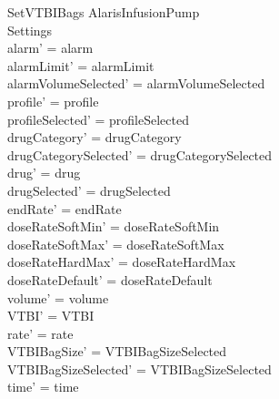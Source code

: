 \begin{schema}{SetVTBIBags}
	\Delta AlarisInfusionPump\\
	 Settings\\
	\where
	alarm' = alarm\\
	alarmLimit' = alarmLimit\\
	alarmVolumeSelected' = alarmVolumeSelected\\
	profile' = profile\\
	profileSelected' = profileSelected\\
	drugCategory' = drugCategory\\ 
	drugCategorySelected' = drugCategorySelected\\
	drug' = drug\\ 
	drugSelected' = drugSelected\\
	endRate' = endRate\\
	doseRateSoftMin' = doseRateSoftMin\\
	doseRateSoftMax' = doseRateSoftMax\\
	doseRateHardMax' = doseRateHardMax\\
	doseRateDefault' = doseRateDefault\\
	volume' = volume\\
	VTBI' = VTBI\\
	rate' = rate\\
	VTBIBagSize' = VTBIBagSizeSelected\\ 
	VTBIBagSizeSelected' = VTBIBagSizeSelected\\
	time' = time\\

\end{schema}

